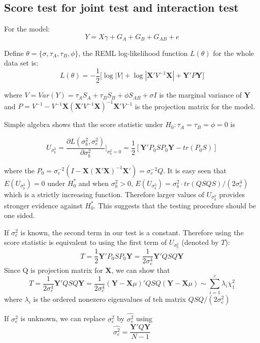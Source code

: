 \documentclass{article}
\newcommand{\Y}{\mathbf{Y}}
\newcommand{\X}{\mathbf{X}}
\begin{document}
        \subsection{Score test for joint test and interaction test}

            For the model:
            \begin{equation*}
                Y=X\gamma+G_A+G_B+G_{AB}+e
            \end{equation*}

            Define $\theta=\{\sigma,\tau_A,\tau_B,\phi\}$, the REML log-likelihood function $L(\theta)$ for the whole data set is:
            \[
                L(\theta)=-\frac{1}{2}\bigg[\log|V|+\log|\X'V^{-1}\X|+\Y'P\Y\bigg]
            \]

             where $V=Var(Y)=\tau_AS_A+\tau_BS_B+\phi S_{AB}+\sigma I$ is the marginal variance of $\Y$ and $P=V^{-1}-V^{-1}\X(\X'V^{-1}\X)^{-1}\X'V^{-1}$ is the projection matrix for the model.

            Simple algebra shows that the score statistic under $H_0:\tau_A=\tau_B=\phi=0$ is

            \[
                U_{\sigma^2_b}=\frac{\partial L(\sigma^2_b,\sigma^2_e)}{\partial \sigma^2_b}\bigg|_{\sigma^2_b=0}=\frac{1}{2}[\Y'P_0SP_0\Y-tr(P_0S)]
            \]

            where the $P_0=\sigma^{-2}_e(I-\X(\X'\X)^{-1}\X')=\sigma^{-2}_eQ$. It is easy seen that $E(U_{\sigma^2_b})=0$ under $H_0^*$ and when $\sigma^2_b>0$, $E(U_{\sigma^2_b})=\sigma^2_b\cdot tr(QSQS)/(2\sigma^4_e)$ which is a strictly increasing function. Therefore larger values of $U_{\sigma_b^2}$ provides stronger evidence against $H_0^*$. This suggests that the testing procedure should be one sided.

            If $\sigma_e^2$ is known, the second term in our test is a constant. Therefore using the score statistic is equivalent to using the first term of $U_{\sigma^2_b}$ (denoted by $T$):
            \[
                T=\frac{1}{2}\Y'P_0SP_0\Y=\frac{1}{2\sigma^4_e}\Y'QSQ\Y
            \]
            Since Q is projection matrix for $\X$, we can show that
            \[
                T=\frac{1}{2\sigma^4_e}\Y'QSQ\Y=\frac{1}{2\sigma^4_e}(\Y-\X\mu)'QSQ(\Y-\X\mu)\sim\sum_{i=1}^c\lambda_i\chi^2_1
            \]
            where $\lambda_i$ is the ordered nonezero eigenvalues of teh matrix $QSQ/(2\sigma^2_e)$

            If $\sigma^2_e$ is unknown, we can replace $\sigma^2_e$ by $\hat{\sigma^2_e}$ using
            \[
                \hat{\sigma^2_e}=\frac{\Y'Q\Y}{N-1}
            \]
\end{document}
